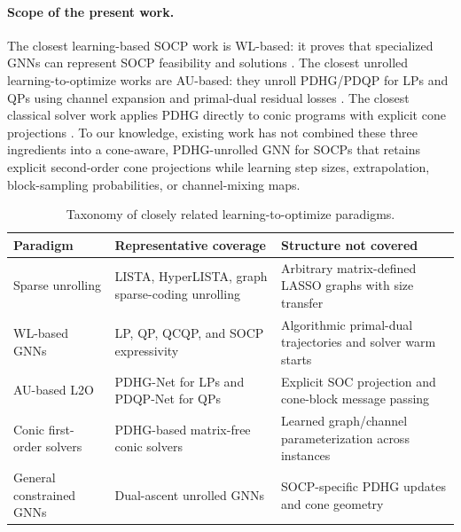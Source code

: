 \documentclass[10pt,twocolumn]{article}
\begin{document}
\paragraph{Scope of the present work.}
The closest learning-based SOCP work is WL-based: it proves that specialized GNNs can represent SOCP feasibility and solutions \citep{li2026socpgnn}.
The closest unrolled learning-to-optimize works are AU-based: they unroll PDHG/PDQP for LPs and QPs using channel expansion and primal-dual residual losses \citep{li2024pdhgnet,yang2024pdqpnet}.
The closest classical solver work applies PDHG directly to conic programs with explicit cone projections \citep{lin2026pdcs}.
To our knowledge, existing work has not combined these three ingredients into a cone-aware, PDHG-unrolled GNN for SOCPs that retains explicit second-order cone projections while learning step sizes, extrapolation, block-sampling probabilities, or channel-mixing maps.

\begin{table}[t]
\centering
\caption{Taxonomy of closely related learning-to-optimize paradigms.}
\label{tab:novelty}
\small
\begin{tabular}{@{}p{}p{}p{}@{}}
\toprule
Paradigm & Representative coverage & Structure not covered \\
\midrule
Sparse unrolling & LISTA, HyperLISTA, graph sparse-coding unrolling & Arbitrary matrix-defined LASSO graphs with size transfer \\
WL-based GNNs & LP, QP, QCQP, and SOCP expressivity & Algorithmic primal-dual trajectories and solver warm starts \\
AU-based L2O & PDHG-Net for LPs and PDQP-Net for QPs & Explicit SOC projection and cone-block message passing \\
Conic first-order solvers & PDHG-based matrix-free conic solvers & Learned graph/channel parameterization across instances \\
General constrained GNNs & Dual-ascent unrolled GNNs & SOCP-specific PDHG updates and cone geometry \\
\bottomrule
\end{tabular}
\end{table}



\end{document}
